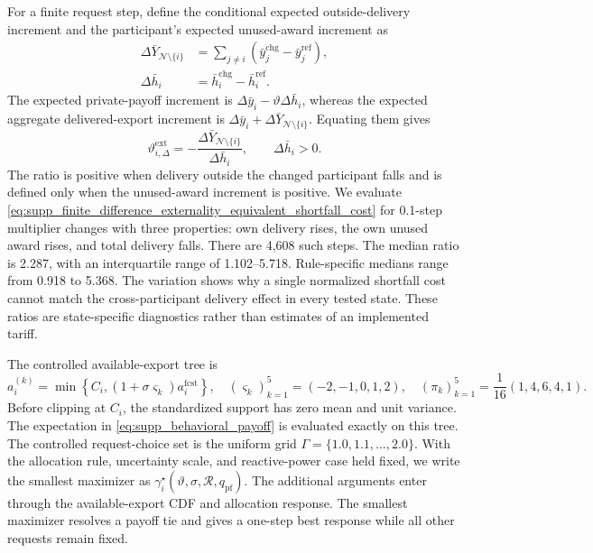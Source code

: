\documentclass[11pt]{article}
\begin{document}
For a finite request step, define the conditional expected outside-delivery
increment and the participant's expected unused-award increment as
\begin{align}
\Delta\bar Y_{\mathcal N\setminus\{i\}}
&=\sum_{j\ne i}(\bar y_j^{\mathrm{chg}}-\bar y_j^{\mathrm{ref}}),\nonumber\\
\Delta\bar h_i
&=\bar h_i^{\mathrm{chg}}-\bar h_i^{\mathrm{ref}}.
\label{eq:supp_finite_difference_components}
\end{align}
The expected private-payoff increment is
$\Delta\bar y_i-\vartheta\Delta\bar h_i$, whereas the expected
aggregate delivered-export increment is
$\Delta\bar y_i+\Delta\bar Y_{\mathcal N\setminus\{i\}}$. Equating them gives
\begin{equation}
\vartheta_{i,\Delta}^{\mathrm{ext}}
=-\frac{\Delta\bar Y_{\mathcal N\setminus\{i\}}}{\Delta\bar h_i},
\qquad \Delta\bar h_i>0.
\label{eq:supp_finite_difference_externality_equivalent_shortfall_cost}
\end{equation}
The ratio is positive when delivery outside the changed participant falls and
is defined only when the unused-award increment is positive. We evaluate
\eqref{eq:supp_finite_difference_externality_equivalent_shortfall_cost} for
0.1-step multiplier changes with three properties: own delivery rises, the own
unused award rises, and total delivery falls. There are 4,608 such steps.
The median ratio is 2.287, with an interquartile range of 1.102--5.718.
Rule-specific medians range from 0.918 to 5.368. The variation shows why a
single normalized shortfall cost cannot match the cross-participant delivery
effect in every tested state. These ratios are state-specific diagnostics rather
than estimates of an implemented tariff.

The controlled available-export tree is
\begin{equation}
a_i^{(k)}=\min\!\left\{C_i,
(1+\sigma\varsigma_k)a_i^{\mathrm{fcst}}\right\},
\quad
(\varsigma_k)_{k=1}^{5}=(-2,-1,0,1,2),
\quad
(\pi_k)_{k=1}^{5}=\frac{1}{16}(1,4,6,4,1).
\label{eq:supp_available_export_tree}
\end{equation}
Before clipping at $C_i$, the standardized support has zero mean and unit
variance. The expectation in \eqref{eq:supp_behavioral_payoff} is evaluated
exactly on this tree. The controlled request-choice set is the uniform grid
$\Gamma=\{1.0,1.1,\ldots,2.0\}$. With the allocation rule, uncertainty scale,
and reactive-power case held fixed, we write the smallest maximizer as
$\gamma_i^\star(\vartheta,\sigma,\mathcal R,q_{\mathrm{pf}})$. The additional
arguments enter through the available-export CDF and allocation response. The
smallest maximizer resolves a payoff tie and gives a one-step best response
while all other requests remain fixed.
\end{document}
